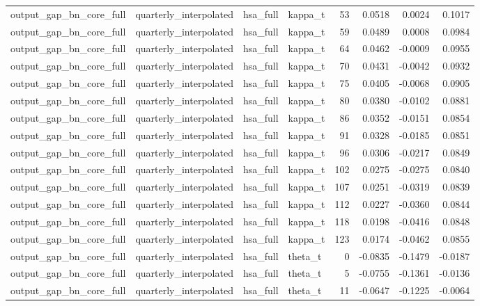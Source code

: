 \begin{tabular}{llllrrrr}
output\_gap\_bn\_core\_full & quarterly\_interpolated & hsa\_full & kappa\_t & 53 & 0.0518 & 0.0024 & 0.1017 \\
output\_gap\_bn\_core\_full & quarterly\_interpolated & hsa\_full & kappa\_t & 59 & 0.0489 & 0.0008 & 0.0984 \\
output\_gap\_bn\_core\_full & quarterly\_interpolated & hsa\_full & kappa\_t & 64 & 0.0462 & -0.0009 & 0.0955 \\
output\_gap\_bn\_core\_full & quarterly\_interpolated & hsa\_full & kappa\_t & 70 & 0.0431 & -0.0042 & 0.0932 \\
output\_gap\_bn\_core\_full & quarterly\_interpolated & hsa\_full & kappa\_t & 75 & 0.0405 & -0.0068 & 0.0905 \\
output\_gap\_bn\_core\_full & quarterly\_interpolated & hsa\_full & kappa\_t & 80 & 0.0380 & -0.0102 & 0.0881 \\
output\_gap\_bn\_core\_full & quarterly\_interpolated & hsa\_full & kappa\_t & 86 & 0.0352 & -0.0151 & 0.0854 \\
output\_gap\_bn\_core\_full & quarterly\_interpolated & hsa\_full & kappa\_t & 91 & 0.0328 & -0.0185 & 0.0851 \\
output\_gap\_bn\_core\_full & quarterly\_interpolated & hsa\_full & kappa\_t & 96 & 0.0306 & -0.0217 & 0.0849 \\
output\_gap\_bn\_core\_full & quarterly\_interpolated & hsa\_full & kappa\_t & 102 & 0.0275 & -0.0275 & 0.0840 \\
output\_gap\_bn\_core\_full & quarterly\_interpolated & hsa\_full & kappa\_t & 107 & 0.0251 & -0.0319 & 0.0839 \\
output\_gap\_bn\_core\_full & quarterly\_interpolated & hsa\_full & kappa\_t & 112 & 0.0227 & -0.0360 & 0.0844 \\
output\_gap\_bn\_core\_full & quarterly\_interpolated & hsa\_full & kappa\_t & 118 & 0.0198 & -0.0416 & 0.0848 \\
output\_gap\_bn\_core\_full & quarterly\_interpolated & hsa\_full & kappa\_t & 123 & 0.0174 & -0.0462 & 0.0855 \\
output\_gap\_bn\_core\_full & quarterly\_interpolated & hsa\_full & theta\_t & 0 & -0.0835 & -0.1479 & -0.0187 \\
output\_gap\_bn\_core\_full & quarterly\_interpolated & hsa\_full & theta\_t & 5 & -0.0755 & -0.1361 & -0.0136 \\
output\_gap\_bn\_core\_full & quarterly\_interpolated & hsa\_full & theta\_t & 11 & -0.0647 & -0.1225 & -0.0064 \\

\end{tabular}
